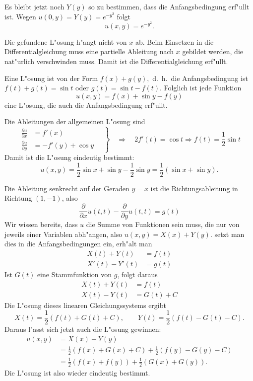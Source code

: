 {\begin{loesung}
\begin{teilaufgaben}
Es bleibt jetzt noch $Y(y)$ so zu bestimmen, dass die Anfangsbedingung
erf"ullt ist. Wegen $u(0,y)=Y(y)=e^{-y^2}$ folgt
\[
u(x,y)=e^{-y^2}.
\]
\item
Die gefundene L"osung h"angt nicht von $x$ ab. Beim Einsetzen
in die Differentialgleichung muss eine partielle Ableitung nach
$x$ gebildet werden, die nat"urlich verschwinden muss. Damit ist
die Differentialgleichung erf"ullt.
\item
Eine L"osung ist von der Form
$f(x)+g(y),$
d.~h.~die Anfangsbedingung ist $f(t)+g(t)=\sin t$ oder $g(t)=\sin t-f(t)$.
Folglich ist jede Funktion
\[
u(x,y)=f(x)+\sin y-f(y)
\]
eine L"osung, die auch die Anfangsbedingung erf"ullt.
\item
Die Ableitungen der allgemeinen L"osung sind
\[
\left.
\begin{aligned}
\frac{\partial u}{\partial x}
&=
f'(x)
\\
\frac{\partial u}{\partial y}
&=
-f'(y)+\cos y
\end{aligned}
\quad
\right\}
\quad
\Rightarrow
\quad
2f'(t)=\cos t
\Rightarrow f(t)=\frac12\sin t
\]
Damit ist die L"osung eindeutig bestimmt:
\[
u(x,y)=\frac12\sin x+\sin y-\frac12\sin y=\frac12(\sin x+\sin y).
\]
\item
Die Ableitung senkrecht auf der Geraden $y=x$ ist die Richtungsableitung
in Richtung $(1,-1)$, also
\[
\frac{\partial}{\partial x}u(t,t)-\frac{\partial}{\partial y}u(t,t)=g(t)
\]
Wir wissen bereits, dass $u$ die Summe von Funktionen sein muss, die
nur von jeweils einer Variablen abh"angen, also
$u(x,y)=X(x)+Y(y)$. setzt man dies in die Anfangsbedingungen
ein, erh"alt man
\begin{align*}
X(t)+Y(t)&=f(t)\\
X'(t)-Y'(t)&=g(t)
\end{align*}
Ist $G(t)$ eine Stammfunktion von $g$, folgt daraus
\begin{align*}
X(t)+Y(t)&=f(t)\\
X(t)-Y(t)&=G(t) + C
\end{align*}
Die L"osung dieses linearen Gleichungssystems ergibt
\[
X(t)=\frac12(f(t)+G(t)+C),\qquad 
Y(t)=\frac12(f(t)-G(t)-C).
\]
Daraus l"asst sich jetzt auch die L"osung gewinnen:
\begin{align*}
u(x,y)&=X(x)+Y(y)
\\
&=
\frac12(f(x)+G(x)+C)
+
\frac12(f(y)-G(y)-C)
\\
&=
\frac12(f(x)+f(y))+\frac12(G(x)+G(y)).
\end{align*}
Die L"osung ist also wieder eindeutig bestimmt.
\item

\end{teilaufgaben}
\end{loesung}}
